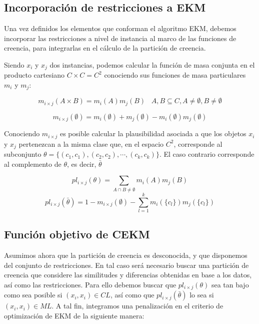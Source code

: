 \subsection{Incorporación de restricciones a EKM}

Una vez definidos los elementos que conforman el algoritmo \acs{EKM}, debemos incorporar las restricciones a nivel de instancia al marco de las funciones de creencia, para integrarlas en el cálculo de la partición de creencia.

Siendo $x_i$ y $x_j$ dos instancias, podemos calcular la función de masa conjunta en el producto cartesiano $C \times C = C^2$ conociendo sus funciones de masa particulares $m_i$ y $m_j$:

\begin{equation}
m_{i \times j}(A \times B) = m_i(A)m_j(B) \;\;\; A,B \subseteq C, A \neq \emptyset, B \neq \emptyset
\label{eqn21}
\end{equation}

\begin{equation}
m_{i \times j}(\emptyset) = m_i(\emptyset) + m_j(\emptyset) - m_i(\emptyset)m_j(\emptyset)
\label{eqn22}
\end{equation}

Conociendo $ m_{i \times j} $ es posible calcular la plausibilidad asociada a que los objetos $x_i$ y $x_j$ pertenezcan a la misma clase que, en el espacio $C^2$, corresponde al subconjunto $\theta = \{(c_1, c_1), (c_2, c_2), \cdots, (c_k, c_k)\}$. El caso contrario corresponde al complemento de $\theta$, es decir, $\bar{\theta}$

\begin{equation}
pl_{i\times j}(\theta) = \sum_{A \cap B \ne \emptyset}m_i(A)m_j(B)
\label{eqn23}
\end{equation}
\begin{equation}
pl_{i\times j}(\bar{\theta}) = 1 - m_{i\times j}(\emptyset) - \sum_{l=1}^{k} m_i(\{c_l\})m_j(\{c_l\})
\label{eqn24}
\end{equation}

\subsection{Función objetivo de CEKM}

Asumimos ahora que la partición de creencia es desconocida, y que disponemos del conjunto de restricciones. En tal caso será necesario buscar una partición de creencia que considere las similitudes y diferencias obtenidas en base a los datos, así como las restricciones. Para ello debemos buscar que $pl_{i\times j} (\theta)$ sea tan bajo como sea posible si $(x_i, x_i) \in CL$, así como que $pl_{i\times j} (\bar{\theta})$ lo sea si $(x_i, x_i) \in ML$. A tal fin, integramos una penalización en el criterio de optimización de \acs{EKM} de la siguiente manera:

